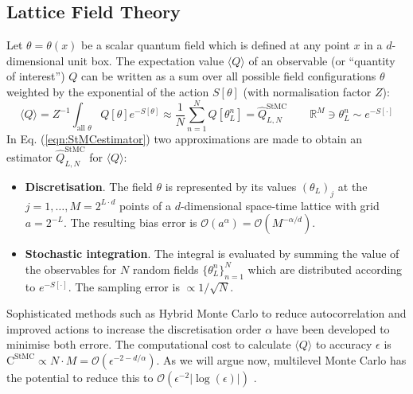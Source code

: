 \documentclass[11pt]{article}
\begin{document}
\subsection{Lattice Field Theory}
Let $\theta=\theta(x)$ be a scalar quantum field which is defined at any point $x$ in a $d$-dimensional unit box. The expectation value $\langle Q\rangle$ of an observable (or ``quantity of interest'') $Q$ can be written as a sum over all possible field configurations $\theta$ weighted by the exponential of the action $S[\theta]$ (with normalisation factor $Z$):
\begin{equation}
  \langle Q\rangle = Z^{-1} \int_{\text{all $\theta$}} Q[\theta]e^{-S[\theta]} \approx \frac{1}{N} \sum_{n=1}^N Q[\theta_L^n] = \hat{Q}^{\text{StMC}}_{L,N} \qquad \mathbb{R}^{M}\ni \theta_L^n\sim e^{-S[\cdot]}\label{eqn:StMCestimator}
\end{equation}
In Eq. (\ref{eqn:StMCestimator}) two approximations are made to obtain an estimator $\hat{Q}^{\text{StMC}}_{L,N}$ for $\langle Q\rangle$:
\begin{itemize}
    \item \textbf{Discretisation}. The field $\theta$ is represented by its values $(\theta_L)_j$ at the $j=1,\dots,M=2^{L\cdot d}$ points of a $d$-dimensional space-time lattice with grid $a=2^{-L}$. The resulting bias error is $\mathcal{O}(a^\alpha)=\mathcal{O}(M^{-\alpha/d})$.
    \item \textbf{Stochastic integration}. The integral is evaluated by summing the value of the observables for $N$ random fields $\{\theta_L^n\}_{n=1}^N$ which are distributed according to $e^{-S[\cdot ]}$. The sampling error is $\propto{1/\sqrt{N}}$.
\end{itemize}
Sophisticated methods such as Hybrid Monte Carlo to reduce autocorrelation \cite{Duane1987} and improved actions to increase the discretisation order $\alpha$ \cite{Lepage1994} have been developed to minimise both errore.
The computational cost to calculate $\langle Q\rangle$ to accuracy $\epsilon$ is $\text{C}^{\text{StMC}}\propto N\cdot M=\mathcal{O}(\epsilon^{-2-d/\alpha})$. As we will argue now, multilevel Monte Carlo has the potential to reduce this to $\mathcal{O}(\epsilon^{-2}|\log(\epsilon)|)$ \cite{Dodwell2015}.
\end{document}
